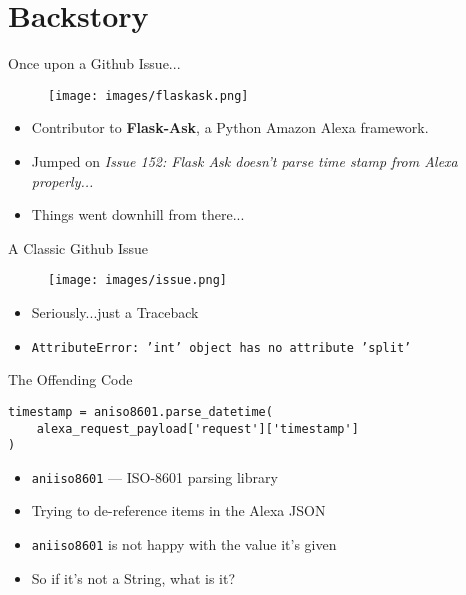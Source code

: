 \documentclass[10pt]{beamer}
\begin{document}
\section{Backstory}
\begin{frame}{Once upon a Github Issue...}
	\begin{figure}
		\centering
		\texttt{[image: images/flaskask.png]}
	\end{figure}
\begin{itemize}
\item Contributor to \textbf{Flask-Ask}, a Python Amazon Alexa framework.
\item Jumped on \textit{Issue 152: Flask Ask doesn't parse time stamp from Alexa properly...}
\item Things went downhill from there...
\end{itemize}
\end{frame}

\begin{frame}[fragile]{A Classic Github Issue}
	\begin{figure}
		\centering
		\texttt{[image: images/issue.png]}
	\end{figure}
	\begin{itemize}
		\item Seriously...just a Traceback
		\item \texttt{AttributeError: 'int' object has no attribute 'split'}
	\end{itemize}
\end{frame}

\begin{frame}[fragile]{The Offending Code}
	\begin{verbatim}
timestamp = aniso8601.parse_datetime(
	alexa_request_payload['request']['timestamp']
)
	\end{verbatim}
	\begin{itemize}
		\item \texttt{aniiso8601} --- ISO-8601 parsing library
		\item Trying to de-reference items in the Alexa JSON
		\item \texttt{aniiso8601} is not happy with the value it's given
		\item So if it's not a String, what is it?
	\end{itemize}
\end{frame}
\end{document}
